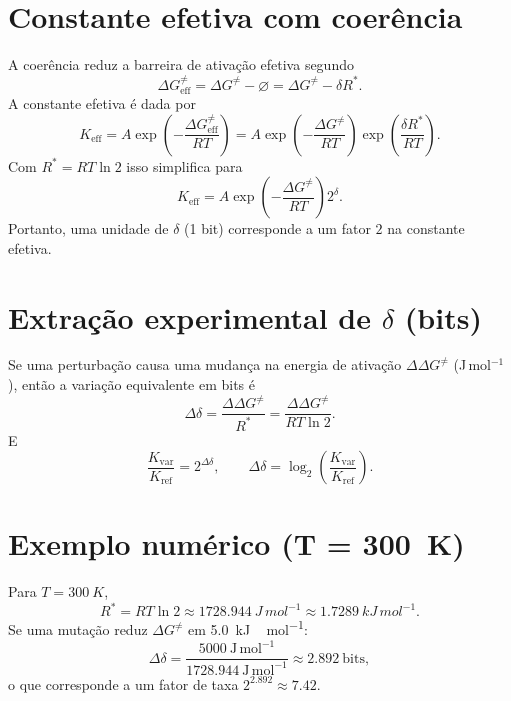 \documentclass[a4paper,12pt]{article}
\begin{document}
\section{Constante efetiva com coerência}
A coerência reduz a barreira de ativação efetiva segundo
\begin{equation}
  \Delta G^{\neq}_{\mathrm{eff}}=\Delta G^{\neq}-\varnothing=\Delta G^{\neq}-\delta R^{*}.
\end{equation}
A constante efetiva é dada por
\begin{equation}
  K_{\mathrm{eff}}=A\exp\!\left(-\frac{\Delta G^{\neq}_{\mathrm{eff}}}{RT}\right)
  =A\exp\!\left(-\frac{\Delta G^{\neq}}{RT}\right)\exp\!\left(\frac{\delta R^{*}}{RT}\right).
\end{equation}
Com $R^{*}=RT\ln 2$ isso simplifica para
\begin{equation}
  K_{\mathrm{eff}}=A\exp\!\left(-\frac{\Delta G^{\neq}}{RT}\right)2^{\delta}.
\end{equation}
Portanto, uma unidade de $\delta$ (1 bit) corresponde a um fator \(2\) na constante efetiva.


\section{Extração experimental de $\delta$ (bits)}
Se uma perturbação causa uma mudança na energia de ativação $\Delta\Delta G^{\neq}$ (J\,mol$^{-1}$), então a variação equivalente em bits é
\begin{equation}
  \Delta\delta=\frac{\Delta\Delta G^{\neq}}{R^{*}}=\frac{\Delta\Delta G^{\neq}}{RT\ln 2}.
\end{equation}
E
\begin{equation}
  \frac{K_{\mathrm{var}}}{K_{\mathrm{ref}}}=2^{\Delta\delta},
  \qquad
  \Delta\delta=\log_{2}\!\left(\frac{K_{\mathrm{var}}}{K_{\mathrm{ref}}}\right).
\end{equation}

\section{Exemplo numérico (T = 300~K)}
Para $T=\SI{300}{K}$,
\begin{equation}
  R^{*}=RT\ln2 \approx \SI{1728.944}{J\,mol^{-1}} \approx \SI{1.7289}{kJ\,mol^{-1}}.
\end{equation}
Se uma mutação reduz $\Delta G^{\neq}$ em \SI{5.0}{kJ\,mol^{-1}}:
\begin{equation}
  \Delta\delta=\frac{5000\ \mathrm{J\,mol^{-1}}}{1728.944\ \mathrm{J\,mol^{-1}}}\approx 2.892\ \text{bits},
\end{equation}
o que corresponde a um fator de taxa $2^{2.892}\approx 7.42$.
\end{document}
